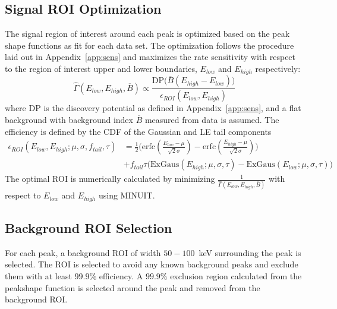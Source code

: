 \documentclass[/main.tex]{subfiles}
\begin{document}
\subsection{Signal ROI Optimization} \label{sec:roiopt}
The signal region of interest around each peak is optimized based on the peak shape functions as fit for each data set.
The optimization follows the procedure laid out in Appendix~\ref{app:sens} and maximizes the rate sensitivity with respect to the region of interest upper and lower boundaries, $E_{low}$ and $E_{high}$ respectively:
\begin{equation}
  \hat\Gamma(E_{low}, E_{high}, \overline B) \propto \frac{\mathrm{DP}\big(\overline B(E_{high}-E_{low})\big)}{\epsilon_{ROI}(E_{low}, E_{high})}
\end{equation}
where $\mathrm{DP}$ is the discovery potential as defined in Appendix~\ref{app:sens}, and a flat background with background index $\overline B$ measured from data is assumed.
The efficiency is defined by the CDF of the Gaussian and LE tail components
\begin{equation}
  \label{eq:PSCDF}
  \begin{aligned}
    \epsilon_{ROI}(E_{low}, E_{high}; \mu, \sigma, f_{tail}, \tau) &= \frac{1}{2}\big(\mathrm{erfc}\left(\frac{E_{low}-\mu}{\sqrt{2}\sigma}\right) - \mathrm{erfc}\left(\frac{E_{high}-\mu}{\sqrt{2}\sigma}\right)\big) \\& + f_{tail}\tau\big(\mathrm{ExGaus}(E_{high}; \mu, \sigma, \tau)-\mathrm{ExGaus}(E_{low}; \mu, \sigma, \tau)\big)
  \end{aligned}
\end{equation}
The optimal ROI is numerically calculated by minimizing $\frac{1}{\hat\Gamma(E_{low}, E_{high}, \overline B)}$ with respect to $E_{low}$ and $E_{high}$ using MINUIT\cite{minuit}.

\subsection{Background ROI Selection}
For each peak, a background ROI of width $50-100$~keV surrounding the peak is selected.
The ROI is selected to avoid any known background peaks and exclude them with at least $99.9\%$ efficiency.
A $99.9\%$ exclusion region calculated from the peakshape function is selected around the peak and removed from the background ROI.
\end{document}
